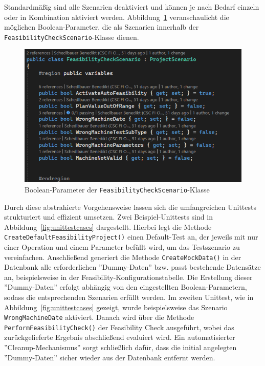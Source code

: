 Standardmäßig sind alle Szenarien deaktiviert und können je nach Bedarf einzeln oder in Kombination aktiviert werden. Abbildung~\ref{fig:unittests-parameters} veranschaulicht die möglichen Boolean-Parameter, die als Szenarien innerhalb der \texttt{FeasibilityCheckScenario}-Klasse dienen.

\begin{figure}[!htb]
    \centering
    \includegraphics[width=1\textwidth]{bilder/unittests-parameters.png}
    \caption{Boolean-Parameter der \texttt{FeasibilityCheckScenario}-Klasse}
    \label{fig:unittests-parameters}
\end{figure}

Durch diese abstrahierte Vorgehensweise lassen sich die umfangreichen Unittests strukturiert und effizient umsetzen. Zwei Beispiel-Unittests sind in Abbildung~\ref{fig:unittestcases} dargestellt. Hierbei legt die Methode \texttt{CreateDefaultFeasibilityProject()} einen Default-Test an, der jeweils mit nur einer Operation und einem Parameter befüllt wird, um das Testszenario zu vereinfachen. Anschließend generiert die Methode \texttt{CreateMockData()} in der Datenbank alle erforderlichen ''Dummy-Daten'' bzw. passt bestehende Datensätze an, beispielsweise in der Feasibility-Konfigurationstabelle. Die Erstellung dieser ''Dummy-Daten'' erfolgt abhängig von den eingestellten \linebreak Boolean-Parametern, sodass die entsprechenden Szenarien erfüllt werden. Im zweiten Unittest, wie in Abbildung~\ref{fig:unittestcases} gezeigt, wurde beispielsweise das Szenario \texttt{WrongMachineDate} aktiviert. Danach wird über die Methode \texttt{PerformFeasibilityCheck()} der Feasibility Check ausgeführt, wobei das zurückgelieferte Ergebnis abschließend evaluiert wird. Ein automatisierter ''Cleanup-Mechanismus'' sorgt schließlich dafür, dass die initial angelegten ''Dummy-Daten'' sicher wieder aus der Datenbank entfernt werden.

